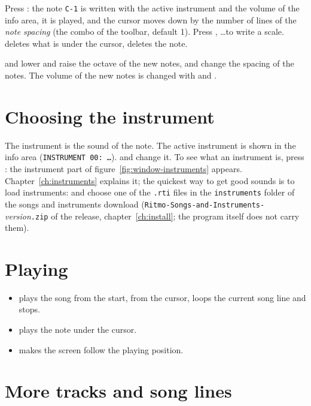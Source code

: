Press : the note \texttt{C-1} is written with the active instrument and the volume of the info area, it is played, and
the cursor moves down by the number of lines of the \emph{note spacing} (the combo of the toolbar, default 1). Press
, \ldots to write a scale.  deletes what is under the cursor,  deletes the note.

\begin{tip}
 and  lower and raise the octave of the new notes,  and 
change the spacing of the notes. The volume of the new notes is changed with  and
.
\end{tip}

\section{Choosing the instrument}

The instrument is the sound of the note. The active instrument is shown in the info area (\texttt{INSTRUMENT 00: \ldots}).
 and  change it. To see what an instrument is, press : the instrument part of figure~\ref{fig:window-instruments} appears. Chapter~\ref{ch:instruments}
explains it; the quickest way to get good sounds is to load instruments: 
and choose one of the \texttt{.rti} files in the \texttt{instruments} folder of the songs and instruments download
(\texttt{Ritmo-Songs-and-Instruments-}\emph{version}\texttt{.zip} of the release, chapter~\ref{ch:install}; the program
itself does not carry them).

\section{Playing}

\begin{itemize}
  \item {} plays the song from the start,  from the cursor,  loops the current song line and
         stops.
  \item {} plays the note under the cursor.
  \item {} makes the screen follow the playing position.
\end{itemize}

\section{More tracks and song lines}

